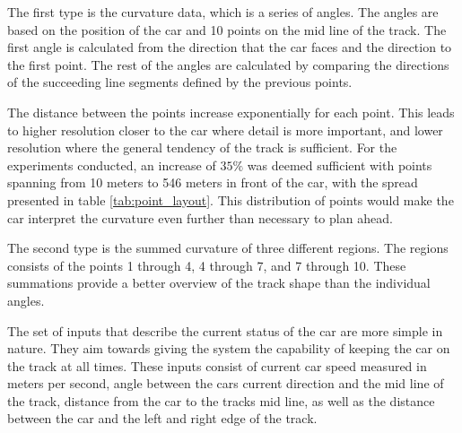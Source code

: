 The first type is the curvature data, which is a series of angles. The angles are based on the position of the car and 10 points on the mid line of the track. The first angle is calculated from the direction that the car faces and the direction to the first point. The rest of the angles are calculated by comparing the directions of the succeeding line segments defined by the previous points.

The distance between the points increase exponentially for each point. This leads to higher resolution closer to the car where detail is more important, and lower resolution where the general tendency of the track is sufficient. For the experiments conducted, an increase of $35\%$ was deemed sufficient with points spanning from 10 meters to 546 meters in front of the car, with the spread presented in table \ref{tab:point_layout}. This distribution of points would make the car interpret the curvature even further than necessary to plan ahead.



The second type is the summed curvature of three different regions. The regions consists of the points 1 through 4, 4 through 7, and 7 through 10. These summations provide a better overview of the track shape than the individual angles. 

The set of inputs that describe the current status of the car are more simple in nature. They aim towards giving the system the capability of keeping the car on the track at all times. These inputs consist of current car speed measured in meters per second, angle between the cars current direction and the mid line of the track, distance from the car to the tracks mid line, as well as the distance between the car and the left and right edge of the track.

